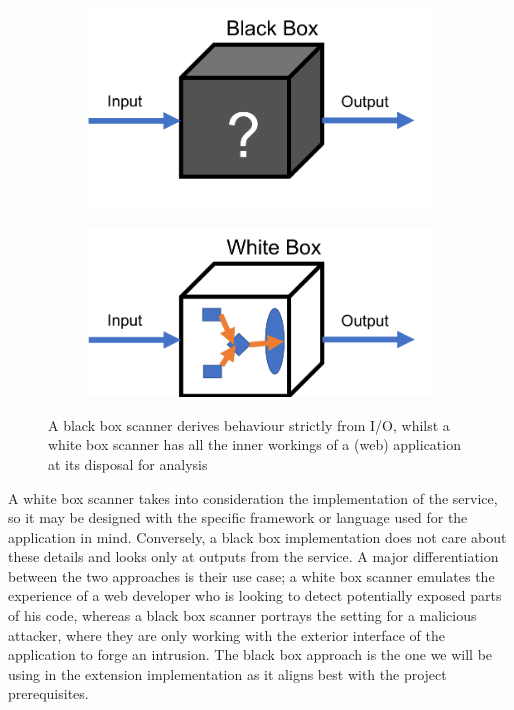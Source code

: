 \begin{figure}[h]
	\centering
	\begin{subfigure}{.5\textwidth}
		\centering
		\includegraphics[width=.8\linewidth]{images/black_box.png}
		\label{fig:blackBox}
	\end{subfigure}%
	\begin{subfigure}{.5\textwidth}
		\centering
		\includegraphics[width=.8\linewidth]{images/white_box.png}
		\label{fig:whiteBox}
	\end{subfigure}
	\caption{A black box scanner derives behaviour strictly from I/O, whilst a white box scanner has all the inner workings of a (web) application at its disposal for analysis}
	\label{fig:test}
\end{figure}


 A white box scanner takes into consideration the implementation of the service, so it may be designed with the specific framework or language used for the application in mind. Conversely, a black box implementation does not care about these details and looks only at outputs from the service. A major differentiation between the two approaches is their use case; a white box scanner emulates the experience of a web developer who is looking to detect potentially exposed parts of his code, whereas a black box scanner portrays the setting for a malicious attacker, where they are only working with the exterior interface of the application to forge an intrusion. The black box approach is the one we will be using in the extension implementation as it aligns best with the project prerequisites.

